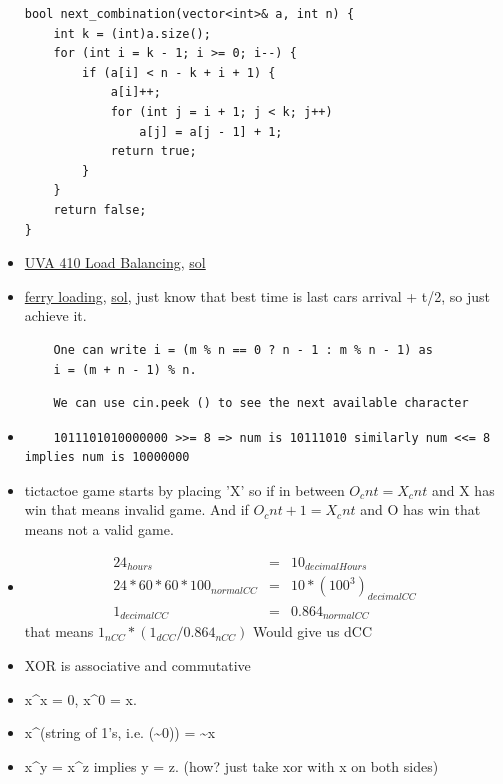 \documentclass[8pt, a4paper, oneside, twocolumn]{extarticle}
\begin{document}
\begin{itemize}
\begin{verbatim}
bool next_combination(vector<int>& a, int n) {
    int k = (int)a.size();
    for (int i = k - 1; i >= 0; i--) {
        if (a[i] < n - k + i + 1) {
            a[i]++;
            for (int j = i + 1; j < k; j++)
                a[j] = a[j - 1] + 1;
            return true;
        }
    }
    return false;
}
\end{verbatim}
    \item \href{https://uva.onlinejudge.org/external/4/410.pdf}{UVA 410 Load Balancing}, \href{https://gist.github.com/sourabh2311/5405601b47b1bd9c8fa769c82b280328}{sol}
    \item \href{https://uva.onlinejudge.org/external/104/10440.pdf}{ferry loading}, \href{https://gist.github.com/sourabh2311/4af5bc294ab613057de828b308da587a}{sol}, just know that best time is last cars arrival + t/2, so just achieve it.
    \begin{verbatim}
    One can write i = (m % n == 0 ? n - 1 : m % n - 1) as
    i = (m + n - 1) % n.
    \end{verbatim}
    \begin{verbatim}
    We can use cin.peek () to see the next available character
    \end{verbatim}
    \item
    \begin{verbatim}
    1011101010000000 >>= 8 => num is 10111010 similarly num <<= 8 implies num is 10000000
    \end{verbatim}
    \item tictactoe game starts by placing 'X' so if in between $O_cnt = X_cnt$ and X has win that means invalid game. And if $O_cnt + 1 = X_cnt$ and O has win that means not a valid game.
    \item 
    \begin{eqnarray}
    24_{hours} & = & 10_{decimalHours} \\
    24 * 60 * 60 * 100_{normalCC} & = & 10 * (100^3)_{decimalCC} \\
    1_{decimalCC} & = & 0.864_{normalCC} 
    \end{eqnarray}
    that means $1_{nCC} * (1_{dCC}/0.864_{nCC})$ Would give us dCC
    \item XOR is associative and commutative
    \item x\^{}x = 0, x\^{}0 = x.
    \item x\^{}(string of 1's, i.e. (\~{}0)) = \~{}x
    \item x\^{}y = x\^{}z implies y = z. (how? just take xor with x on both sides)

\end{itemize}
\end{document}

